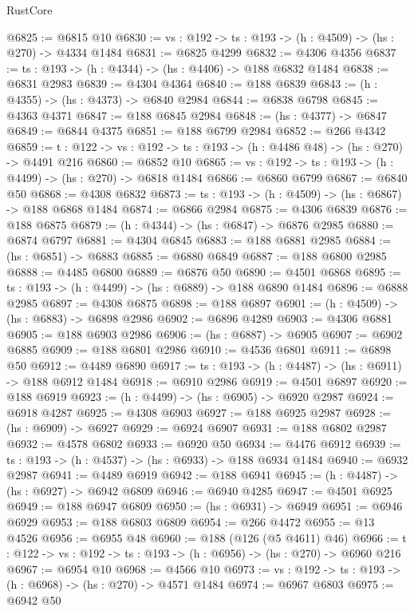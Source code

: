 \begin{lexlean}{RustCore}
\begin{coremodule}
@6825 := @6815 @10
@6830 := {vs : @192} -> {ts : @193} -> (h : @4509) -> (hs : @270) -> @4334 @1484
@6831 := @6825 @4299
@6832 := @4306 @4356
@6837 := {ts : @193} -> (h : @4344) -> (hs : @4406) -> @188 @6832 @1484
@6838 := @6831 @2983
@6839 := @4304 @4364
@6840 := @188 @6839
@6843 := (h : @4355) -> (hs : @4373) -> @6840 @2984
@6844 := @6838 @6798
@6845 := @4363 @4371
@6847 := @188 @6845 @2984
@6848 := (hs : @4377) -> @6847
@6849 := @6844 @4375
@6851 := @188 @6799 @2984
@6852 := @266 @4342
@6859 := {t : @122} -> {vs : @192} -> {ts : @193} -> (h : @4486 @48) -> (hs : @270) -> @4491 @216
@6860 := @6852 @10
@6865 := {vs : @192} -> {ts : @193} -> (h : @4499) -> (hs : @270) -> @6818 @1484
@6866 := @6860 @6799
@6867 := @6840 @50
@6868 := @4308 @6832
@6873 := {ts : @193} -> (h : @4509) -> (hs : @6867) -> @188 @6868 @1484
@6874 := @6866 @2984
@6875 := @4306 @6839
@6876 := @188 @6875
@6879 := (h : @4344) -> (hs : @6847) -> @6876 @2985
@6880 := @6874 @6797
@6881 := @4304 @6845
@6883 := @188 @6881 @2985
@6884 := (hs : @6851) -> @6883
@6885 := @6880 @6849
@6887 := @188 @6800 @2985
@6888 := @4485 @6800
@6889 := @6876 @50
@6890 := @4501 @6868
@6895 := {ts : @193} -> (h : @4499) -> (hs : @6889) -> @188 @6890 @1484
@6896 := @6888 @2985
@6897 := @4308 @6875
@6898 := @188 @6897
@6901 := (h : @4509) -> (hs : @6883) -> @6898 @2986
@6902 := @6896 @4289
@6903 := @4306 @6881
@6905 := @188 @6903 @2986
@6906 := (hs : @6887) -> @6905
@6907 := @6902 @6885
@6909 := @188 @6801 @2986
@6910 := @4536 @6801
@6911 := @6898 @50
@6912 := @4489 @6890
@6917 := {ts : @193} -> (h : @4487) -> (hs : @6911) -> @188 @6912 @1484
@6918 := @6910 @2986
@6919 := @4501 @6897
@6920 := @188 @6919
@6923 := (h : @4499) -> (hs : @6905) -> @6920 @2987
@6924 := @6918 @4287
@6925 := @4308 @6903
@6927 := @188 @6925 @2987
@6928 := (hs : @6909) -> @6927
@6929 := @6924 @6907
@6931 := @188 @6802 @2987
@6932 := @4578 @6802
@6933 := @6920 @50
@6934 := @4476 @6912
@6939 := {ts : @193} -> (h : @4537) -> (hs : @6933) -> @188 @6934 @1484
@6940 := @6932 @2987
@6941 := @4489 @6919
@6942 := @188 @6941
@6945 := (h : @4487) -> (hs : @6927) -> @6942 @6809
@6946 := @6940 @4285
@6947 := @4501 @6925
@6949 := @188 @6947 @6809
@6950 := (hs : @6931) -> @6949
@6951 := @6946 @6929
@6953 := @188 @6803 @6809
@6954 := @266 @4472
@6955 := @13 @4526
@6956 := @6955 @48
@6960 := @188 (@126 (@5 @4611) @46)
@6966 := {t : @122} -> {vs : @192} -> {ts : @193} -> (h : @6956) -> (hs : @270) -> @6960 @216
@6967 := @6954 @10
@6968 := @4566 @10
@6973 := {vs : @192} -> {ts : @193} -> (h : @6968) -> (hs : @270) -> @4571 @1484
@6974 := @6967 @6803
@6975 := @6942 @50

\end{coremodule}
\end{lexlean}
